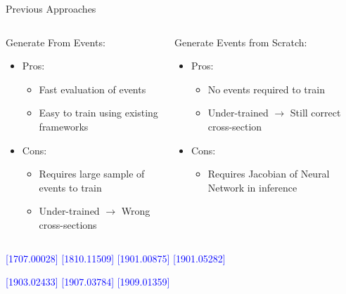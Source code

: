 \documentclass{beamer}
\newcommand\reference[1]{%
{\tiny \textcolor{blue}{[#1]}}
}
\begin{document}
\begin{frame}{Previous Approaches}

\begin{columns}
    \begin{column}{5cm}
    Generate From Events:
    \begin{itemize}
        \item Pros:
        \begin{itemize}
            \item Fast evaluation of events
            \item Easy to train using existing frameworks
        \end{itemize}
        \item Cons:
        \begin{itemize}
            \item Requires large sample of events to train
            \item Under-trained $\rightarrow$ Wrong cross-sections
        \end{itemize}
    \end{itemize}
    \end{column}
    \begin{column}{5cm}
    Generate Events from Scratch:
    \begin{itemize}
        \item Pros:
        \begin{itemize}
            \item No events required to train
            \item Under-trained $\rightarrow$ Still correct cross-section
        \end{itemize}
        \item Cons:
        \begin{itemize}
            \item Requires Jacobian of Neural Network in inference
        \end{itemize}
    \end{itemize}
    \end{column}
\end{columns} 

    \vfill
    \reference{1707.00028} \reference{1810.11509} \reference{1901.00875} \reference{1901.05282}
    \reference{1903.02433} \reference{1907.03784} \reference{1909.01359}
    
\end{frame}
\end{document}
